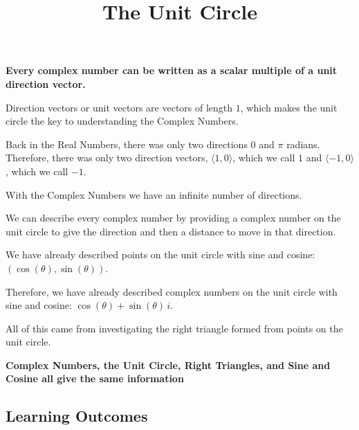 \documentclass{ximera}
\title{The Unit Circle}
\begin{document}
\begin{abstract}
\end{abstract}
\maketitle




\begin{center}
\textbf{\textcolor{red!70!black}{Every complex number can be written as a scalar multiple of a unit direction vector.}}
\end{center}






Direction vectors or unit vectors are vectors of length $1$, which makes the unit circle the key to understanding the Complex Numbers. 


Back in the Real Numbers, there was only two directions $0$ and $\pi$ radians.  Therefore, there was only two direction vectors, $\langle 1, 0 \rangle$, which we call $1$ and $\langle -1, 0 \rangle$, which we call $-1$. 


With the Complex Numbers we have an infinite number of directions.




We can describe every complex number by providing a complex number on the unit circle to give the direction and then a distance to move in that direction.   

We have already described points on the unit circle with sine and cosine: $(\cos(\theta), \sin(\theta))$. 

Therefore, we have already described complex numbers on the unit circle with sine and cosine: $\cos(\theta) + \sin(\theta) \, i$.  


All of this came from investigating the right triangle formed from points on the unit circle. 



\begin{center}
\textbf{\textcolor{purple!85!blue}{Complex Numbers, the Unit Circle, Right Triangles, and Sine and Cosine all give the same information}}
\end{center}









\subsection*{Learning Outcomes}
\end{document}
